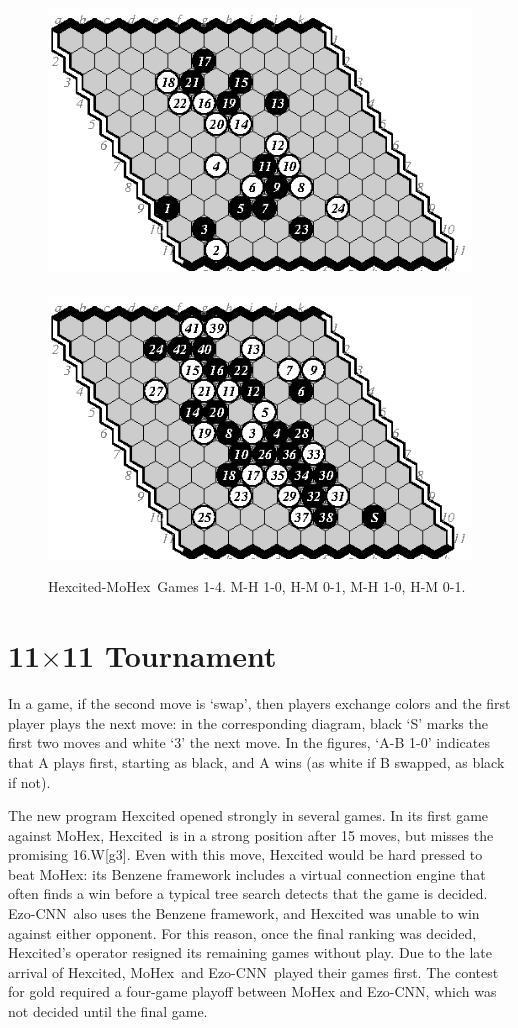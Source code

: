 \documentclass{IOS-Book-Article}
\def\Ec{\mbox{\sc Ezo-CNN}}
\def\Hite{\mbox{\sc Hexcited}}
\def\Mx{\mbox{\sc MoHex}}
\begin{document}
\begin{figure}
\includegraphics[scale=.9]{pix/11.mh3.eps}\hspace*{-1.5cm}\
\includegraphics[scale=.9]{pix/11.hm4.eps}
\caption{\Hite-\Mx\ Games 1-4. M-H 1-0, H-M 0-1, M-H 1-0, H-M 0-1.}
\end{figure}

\section{11$\times$11 Tournament}
In a game, if the second move is `swap', then players
exchange colors and the first player plays the next move:
in the corresponding diagram, black `S' marks the first two moves
and white `3' the next move.
In the figures, `A-B 1-0' indicates that A plays first, starting as black, 
and A wins (as white if B swapped, as black if not).

The new program \Hite{} opened strongly in several games.
In its first game against \Mx, \Hite\ is in a strong
position after 15 moves, but misses the promising 16.W[g3].
Even with this move, \Hite{} would be hard pressed to beat
\Mx: its Benzene framework includes a virtual connection engine
that often finds a win before 
a typical tree search detects that the game is decided.
\Ec\ also uses the Benzene framework,
and \Hite{} was unable to win against either opponent.
For this reason, once the final ranking was decided,
\Hite's operator resigned its remaining games without play.
Due to the late arrival of \Hite{},
\Mx\ and \Ec\ played their games first.
The contest for gold required a four-game playoff between \Mx{} and \Ec{},
which was not decided until the final game.
\end{document}
